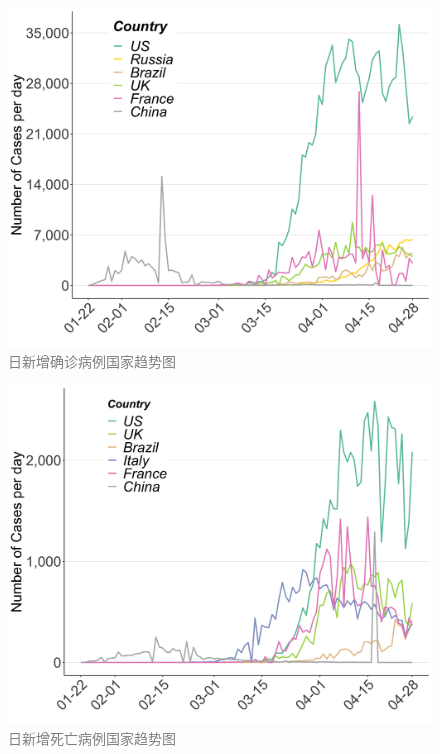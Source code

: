 \documentclass[
]{article}
\begin{document}
\begin{figure}[H]
\centering
{}
\caption{\textcolor{grey}{日新增确诊病例国家趋势图}}
\includegraphics[]{./input/covid2.png}
\end{figure}

\begin{figure}[H]
\centering
{}
\caption{\textcolor{grey}{日新增死亡病例国家趋势图}}
\includegraphics[]{./input/covid3.png}
\end{figure}

\vspace{-7mm}
\end{document}
